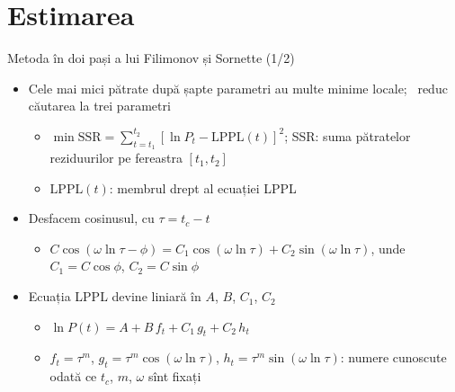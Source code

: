 \section{Estimarea}

\begin{frame}{Metoda în doi pași a lui Filimonov și Sornette (1/2)}
\itemsize{\footnotesize}
\begin{itemize}
    \item Cele mai mici pătrate după șapte parametri au multe minime locale; \ reduc căutarea la trei parametri
    \begin{itemize}
        \item $\min \mathrm{SSR} = \sum_{t=t_1}^{t_2} [\ln P_t - \mathrm{LPPL}(t)]^2$; SSR: suma pătratelor reziduurilor pe fereastra $[t_1, t_2]$
        \item $\mathrm{LPPL}(t)$: membrul drept al ecuației LPPL
    \end{itemize}
    \item Desfacem cosinusul, cu $\tau = t_c - t$
    \begin{itemize}
        \item $C\cos(\omega\ln\tau - \phi) = C_1\cos(\omega\ln\tau) + C_2\sin(\omega\ln\tau)$, unde $C_1 = C\cos\phi$, $C_2 = C\sin\phi$
    \end{itemize}
    \item Ecuația LPPL devine liniară în $A$, $B$, $C_1$, $C_2$
    \begin{itemize}
        \item $\ln P(t) = A + B\,f_t + C_1\,g_t + C_2\,h_t$
        \item $f_t = \tau^m$, $g_t = \tau^m\cos(\omega\ln\tau)$, $h_t = \tau^m\sin(\omega\ln\tau)$: numere cunoscute odată ce $t_c$, $m$, $\omega$ sînt fixați
    \end{itemize}
\end{itemize}
\end{frame}


